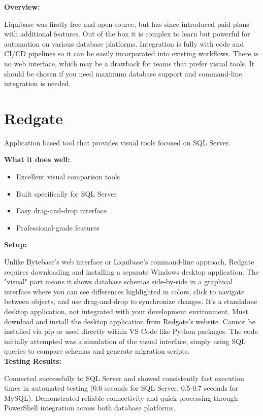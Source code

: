 \documentclass[11pt,a4paper]{article}
\begin{document}
\textbf{Overview:}

Liquibase was firstly free and open-source, but has since introduced paid plans with additional features.
Out of the box it is complex to learn but powerful for automation on various database platforms.
Integration is fully with code and CI/CD pipelines so it can be easily incorporated into existing workflows.
There is no web interface, which may be a drawback for teams that prefer visual tools.
It should be chosen if you need maximum database support and command-line integration is needed.\\

\newpage
\section{Redgate}

Application based tool that provides visual tools focused on SQL Server.

\textbf{What it does well:}
\begin{itemize}
    \item Excellent visual comparison tools
    \item Built specifically for SQL Server
    \item Easy drag-and-drop interface
    \item Professional-grade features
\end{itemize}

\textbf{Setup:}

Unlike Bytebase's web interface or Liquibase's command-line approach, Redgate requires downloading and installing a separate Windows desktop application.
The "visual" part means it shows database schemas side-by-side in a graphical interface where you can see differences highlighted in colors, click to navigate between objects, and use drag-and-drop to synchronize changes.
It's a standalone desktop application, not integrated with your development environment.
Must download and install the desktop application from Redgate's website.
Cannot be installed via pip or used directly within VS Code like Python packages.
The code initially attempted was a simulation of the visual interface, simply using SQL queries to compare schemas and generate migration scripts.\\

\textbf{Testing Results:}

Connected successfully to SQL Server and showed consistently fast execution times in automated testing (0.6 seconds for SQL Server, 0.5-0.7 seconds for MySQL).
Demonstrated reliable connectivity and quick processing through PowerShell integration across both database platforms.\\
\end{document}
